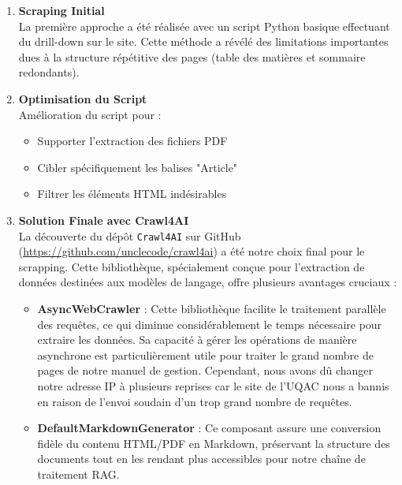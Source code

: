 \documentclass{article}
\begin{document}
\begin{enumerate}
    \item \textbf{Scraping Initial} \\
    La première approche a été réalisée avec un script Python basique effectuant du drill-down sur le site. Cette méthode a révélé des limitations importantes dues à la structure répétitive des pages (table des matières et sommaire redondants).
    
    \item \textbf{Optimisation du Script} \\
    Amélioration du script pour :
    \begin{itemize}
        \item Supporter l'extraction des fichiers PDF
        \item Cibler spécifiquement les balises "Article"
        \item Filtrer les éléments HTML indésirables
    \end{itemize}
    
    \item \textbf{Solution Finale avec Crawl4AI} \\
    La découverte du dépôt \texttt{Crawl4AI} sur GitHub (\href{https://github.com/unclecode/crawl4ai}{https://github.com/unclecode/crawl4ai}) a été notre choix final pour le scrapping. Cette bibliothèque, spécialement conçue pour l'extraction de données destinées aux modèles de langage, offre plusieurs avantages cruciaux :
    
    \begin{itemize}
        \item \textbf{AsyncWebCrawler} : Cette bibliothèque facilite le traitement parallèle des requêtes, ce qui diminue considérablement le temps nécessaire pour extraire les données. Sa capacité à gérer les opérations de manière asynchrone est particulièrement utile pour traiter le grand nombre de pages de notre manuel de gestion. Cependant, nous avons dû changer notre adresse IP à plusieurs reprises car le site de l'UQAC nous a bannis en raison de l'envoi soudain d'un trop grand nombre de requêtes.
        
        \item \textbf{DefaultMarkdownGenerator} : Ce composant assure une conversion fidèle du contenu HTML/PDF en Markdown, préservant la structure des documents tout en les rendant plus accessibles pour notre chaîne de traitement RAG.
        

\end{itemize}
\end{enumerate}
\end{document}
